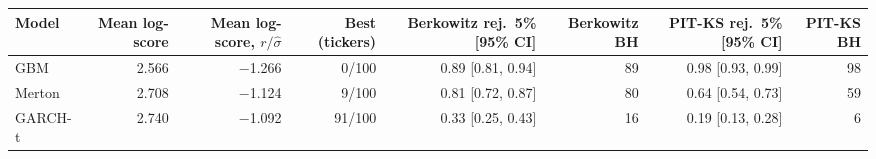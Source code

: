 \begin{tabular}{lrrrrrrr}
\toprule
Model & Mean log-score & Mean log-score, $r/\hat\sigma$ & Best (tickers) & Berkowitz rej.\ 5\% [95\% CI] & Berkowitz BH & PIT-KS rej.\ 5\% [95\% CI] & PIT-KS BH \\
\midrule
GBM & 2.566 & $-$1.266 & 0/100 & 0.89 [0.81, 0.94] & 89 & 0.98 [0.93, 0.99] & 98 \\
Merton & 2.708 & $-$1.124 & 9/100 & 0.81 [0.72, 0.87] & 80 & 0.64 [0.54, 0.73] & 59 \\
GARCH-t & 2.740 & $-$1.092 & 91/100 & 0.33 [0.25, 0.43] & 16 & 0.19 [0.13, 0.28] & 6 \\
\bottomrule
\end{tabular}
